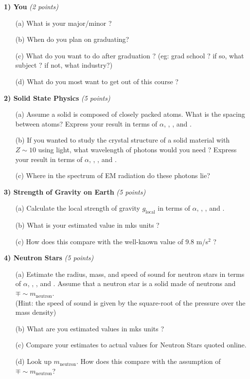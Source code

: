 {\large
\textbf{1) You} \hfill \textit{(2 points)}
\begin{itemize}
\item[(a)]What is your major/minor ? 
\item[(b)]When do you plan on graduating?
\item[(c)]What do you want to do after graduation ? (eg: grad school ? if so, what subject ? if not, what industry?)
\item[(d)]What do you most want to get out of this course ? 
\end{itemize}

\vspace*{0.25in}

\textbf{2) Solid State Physics} \hfill \textit{(5 points)}
\begin{itemize}
\item[(a)] Assume a solid is composed of closely packed atoms. What is the spacing between atoms?  Express your result in terms of  $\alpha$, \aG, \mp, and \me.
\item[(b)] If you wanted to study the crystal structure of a solid material with $Z\sim10$ using light, what wavelength of photons would you need ?
Express your result in terms of  $\alpha$, \aG, \mp, and \me.
\item[(c)] Where in the spectrum of EM radiation do these photons lie?
\end{itemize}

\vspace*{0.25in}

\textbf{3) Strength of Gravity on Earth} \hfill \textit{(5 points)}
\begin{itemize}
\item[(a)]Calculate the local strength of gravity $g_{\textrm{local}}$ in terms of $\alpha$, \aG, \mp, and \me.
\item[(b)]What is your estimated value in mks units ?
\item[(c)]How does this compare with the well-known value of 9.8 m/s$^2$ ?
\end{itemize}

\vspace*{0.25in}

\textbf{4) Neutron Stars } \hfill \textit{(5 points)}
\begin{itemize}
\item[(a)]Estimate the radius, mass, and speed of sound for neutron stars in terms of $\alpha$, \aG, \mp, and \me.
Assume that a neutron star is a solid made of neutrons and $\mp \sim m_{\textrm{neutron}}$. \\
(Hint: the speed of sound is given by the square-root of the pressure over the mass density)
\item[(b)]What are you estimated values in mks units ?
\item[(c)]Compare your estimates to actual values for Neutron Stars quoted online.
\item[(d)]Look up $m_{\textrm{neutron}}$. How does this compare with the assumption of $\mp \sim m_{\textrm{neutron}}$?
\end{itemize}

}
